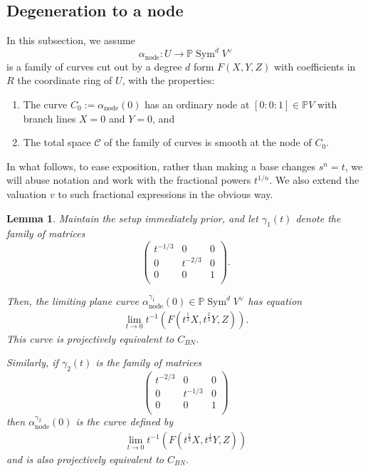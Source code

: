 \documentclass[12 pt, reqno]{amsart}
\newtheorem{lem}[thm]{Lemma}
\theoremstyle{definition}
\newcommand{\on}{\operatorname}
\newcommand{\mb}{\mathbb}
\renewcommand{\P}{\mb{P}}
\begin{document}
\subsection{Degeneration to a node}
\label{nodedegeneration}

In this subsection, we assume
\[\alpha_{\on{node}}: U \to \P \on{Sym}^{d}V^{\vee}\] is a family of
curves cut out by a degree $d$ form $F(X,Y,Z)$ with coefficients in
$R$ the coordinate ring of $U$, with the properties:

\begin{enumerate}
\item The curve $C_{0} := \alpha_{\on{node}}(0)$ has an ordinary node
  at $[0:0:1] \in \P V$ with branch lines $X=0$ and $Y=0$, and
\item The total space $\mathcal{C}$ of the family of curves is smooth
  at the node of $C_{0}$.  
\end{enumerate}

In what follows, to ease exposition, rather than making a base changes
$s^n = t$, we will abuse notation and work with the fractional powers
$t^{1/n}$. We also extend the valuation $v$ to such fractional
expressions in the obvious way.

\begin{lem}
\label{nodematrix}
Maintain the setup immediately prior, and let $\gamma_{1}(t)$ denote
the family of matrices
\[ \begin{pmatrix}
    t^{-1/3} & 0 & 0\\
    0 & t^{-2/3} & 0\\
    0 & 0 & 1\\
  \end{pmatrix}.\]

Then, the limiting plane curve
$\alpha_{\on{node}}^{\gamma_{1}}(0) \in \P \on{Sym}^{d}V^{\vee}$ has
equation
\begin{align*}
  \lim_{t\to 0}{t^{-1}(F(t^{\frac{1}{3}}X,t^{\frac{2}{3}}Y,Z))}.
\end{align*}
This curve is projectively equivalent to $C_{BN}$.

Similarly, if $\gamma_{2}(t)$ is the family of matrices
\[ \begin{pmatrix}
    t^{-2/3} & 0 & 0\\
    0 & t^{-1/3} & 0\\
    0 & 0 & 1\\
  \end{pmatrix}\] then $\alpha_{\on{node}}^{\gamma_{2}}(0)$ is the
curve defined by
\begin{align*}
    \lim_{t\to 0}{t^{-1}(F(t^{\frac{2}{3}}X,t^{\frac{1}{3}}Y,Z))}
\end{align*}
and is also projectively equivalent to $C_{BN}$.
\end{lem}
\end{document}
